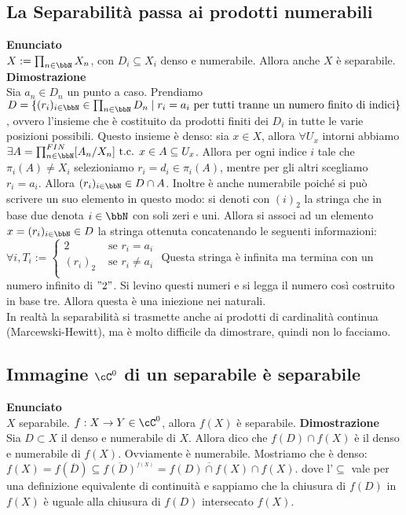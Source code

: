\documentclass[a4paper,11pt,NoNotes,GeneralMath]{stdmdoc}
\newcommand{\Enunciato}{\vskip 0.05cm \noindent \textbf{Enunciato} \\ }
\renewcommand{\Dimostrazione}{\vskip 0.05cm \noindent \textbf{Dimostrazione} \\ }
\renewcommand{\bar}{\overline}
\begin{document}
	\subsection*{La Separabilità passa ai prodotti numerabili}
	\Enunciato $X := \prod_{n \in \bbN} X_n$, con $D_i \subseteq X_i$ denso e numerabile. Allora anche $X$ è separabile.
	\Dimostrazione Sia $a_n \in D_n$ un punto a caso. Prendiamo $D = \{ (r_i)_{i \in \bbN} \in \prod_{n \in \bbN} D_n \mid r_i = a_i \text{ per tutti tranne un numero finito di indici} \}$, ovvero l'insieme che è costituito da prodotti finiti dei $D_i$ in tutte le varie posizioni possibili. Questo insieme è denso: sia $x \in X$, allora $\forall U_x$ intorni abbiamo $\exists A = \prod_{n \in \bbN}^{FIN} [A_n / X_n] \tc x \in A \subseteq U_x$. Allora per ogni indice $i$ tale che $\pi_i(A) \neq X_i$ selezioniamo $r_i = d_i \in \pi_i(A)$, mentre per gli altri scegliamo $r_i = a_i$. Allora $(r_i)_{i \in \bbN} \in D \cap A$. Inoltre è anche numerabile poiché si può scrivere un suo elemento in questo modo: si denoti con $(i)_2$ la stringa che in base due denota $i \in \bbN$ con soli zeri e uni. Allora si associ ad un elemento $x = (r_i)_{i \in \bbN} \in D$ la stringa ottenuta concatenando le seguenti informazioni: $ \forall i, T_i := \left\{ \begin{array}{lc} 2 & \text{ se } r_i = a_i \\ (r_i)_2 & \text{ se } r_i \neq a_i \\ \end{array} \right. $ Questa stringa è infinita ma termina con un numero infinito di $"2"$. Si levino questi numeri e si legga il numero così costruito in base tre. Allora questa è una iniezione nei naturali. \\
	In realtà la separabilità si trasmette anche ai prodotti di cardinalità continua (Marcewski-Hewitt), ma è molto difficile da dimostrare, quindi non lo facciamo.

	\subsection*{Immagine $\cC^0$ di un separabile è separabile}
	\Enunciato $X$ separabile. $f: X \rar Y \in \cC^0$, allora $f(X)$ è separabile.
	\Dimostrazione Sia $D \subset X$ il denso e numerabile di $X$. Allora dico che $f(D) \cap f(X)$ è il denso e numerabile di $f(X)$. Ovviamente è numerabile. Mostriamo che è denso: $f(X) = f(\bar{D}) \subseteq \bar{f(D)}^{{}_{f(X)}} = \bar{f(D) \cap f(X)} \cap f(X)$. dove l'$\subseteq$ vale per una definizione equivalente di continuità e sappiamo che la chiusura di $f(D)$ in $f(X)$ è uguale alla chiusura di $f(D)$ intersecato $f(X)$.
\end{document}
